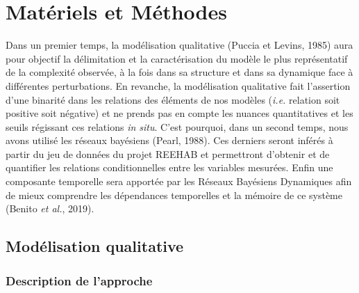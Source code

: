 \documentclass[12pt]{report}
\begin{document}
\begingroup %
\let\clearpage\relax %
\vspace{50pt} %


\chapter{Matériels et Méthodes}

Dans un premier temps, la modélisation qualitative (Puccia et Levins, 1985) aura pour objectif la délimitation et la caractérisation du modèle le plus représentatif de la complexité observée, à la fois dans sa structure et dans sa dynamique face à différentes perturbations.  En revanche, la modélisation qualitative fait l’assertion d’une binarité dans les relations des éléments de nos modèles (\textit{i.e.} relation soit positive soit négative) et ne prends pas en compte les nuances quantitatives et les seuils régissant ces relations \textit{in situ}. C’est pourquoi, dans un second temps, nous avons utilisé les réseaux bayésiens (Pearl, 1988). Ces derniers seront inférés à partir du jeu de données du projet REEHAB et permettront d’obtenir et de quantifier les relations conditionnelles entre les variables mesurées. Enfin une composante temporelle sera apportée par les Réseaux Bayésiens Dynamiques afin de mieux comprendre les dépendances temporelles et la mémoire de ce système (Benito \textit{et al.}, 2019).

    \section{Modélisation qualitative}
    
        \subsection{Description de l'approche}
\end{document}
